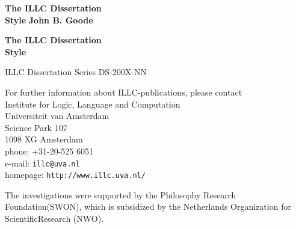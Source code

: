 {\pagestyle{empty}
\newcommand{\printtitle}{%
{\Huge\bf The ILLC Dissertation\\[0.8cm] Style}}    %

\begin{titlepage}
\par\vskip 2cm
\begin{center}
\printtitle
\vfill
{\LARGE\bf John B. Goode}                           %
\vskip 2cm
\end{center}
\end{titlepage}
%
%
\mbox{}\newpage
\setcounter{page}{1}

\par\vskip 2cm
\begin{center}
\printtitle
\end{center}

\clearpage
\par\vskip 2cm
\begin{center}
ILLC Dissertation Series DS-200X-NN                 %
\par\vspace {2cm}
\illclogo{10cm}
\par\vspace {2cm}
\noindent%
For further information about ILLC-publications, please contact\\[2ex]
Institute for Logic, Language and Computation\\
Universiteit van Amsterdam\\
Science Park 107\\
1098 XG Amsterdam\\
phone: +31-20-525 6051\\
e-mail: {\tt illc@uva.nl}\\
homepage: {\tt http://www.illc.uva.nl/}
\end{center}
\vfill

%
\noindent%
The investigations were supported by the            %
Philosophy Research Foundation\linebreak (SWON), 
which is subsidized by the Netherlands 
Organization for Scientific\linebreak Research (NWO).
\par\vspace {2cm}

%

}
